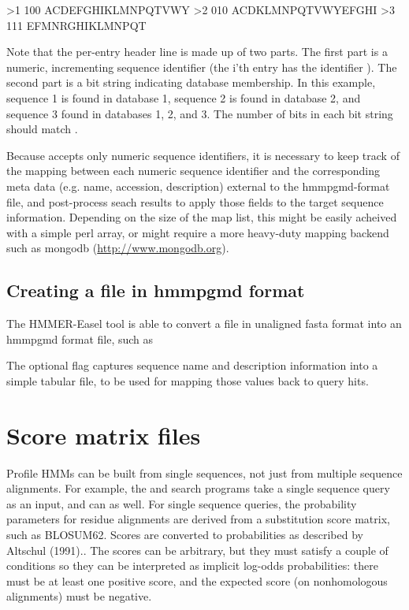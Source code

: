\begin{sreoutput}
>1 100
ACDEFGHIKLMNPQTVWY
>2 010
ACDKLMNPQTVWYEFGHI
>3 111
EFMNRGHIKLMNPQT
\end{sreoutput}

Note that the per-entry header line is made up of two parts. The first part 
is a numeric, incrementing sequence identifier (the i'th entry has the
identifier ). The second part is a bit string indicating database
membership. In this example, sequence 1 is found in database 1, sequence 2 is
found in database 2, and sequence 3 found in databases 1, 2, and 3. The number 
of bits in each bit string should match .

Because  accepts only numeric sequence identifiers, it is
necessary to keep track of the mapping between each numeric sequence identifier
and the corresponding meta data (e.g. name, accession, description) external to
the hmmpgmd-format file, and post-process  seach results to 
apply those fields to the target sequence information.
Depending on the size of the map list, this might be easily acheived with a
simple perl array, or might require a more heavy-duty mapping backend such as
mongodb (\url{http://www.mongodb.org}).
  

\subsection{Creating a file in hmmpgmd format}

The HMMER-Easel tool  is able to convert a file in unaligned
fasta format into an hmmpgmd format file, such as


The optional  flag captures sequence name and description
information into a simple tabular file, to be used for mapping those values 
back to  query hits.



\newpage
\section{Score matrix files}

Profile HMMs can be built from single sequences, not just from
multiple sequence alignments. For example, the  and
 search programs take a single sequence query as an
input, and  can as well. For single sequence queries, the
probability parameters for residue alignments are derived from a
substitution score matrix, such as BLOSUM62. Scores are converted to
probabilities as described by Altschul (1991).\cite{Altschul91}. The
scores can be arbitrary, but they must satisfy a couple of conditions
so they can be interpreted as implicit log-odds probabilities: there
must be at least one positive score, and the expected score (on
nonhomologous alignments) must be negative.

